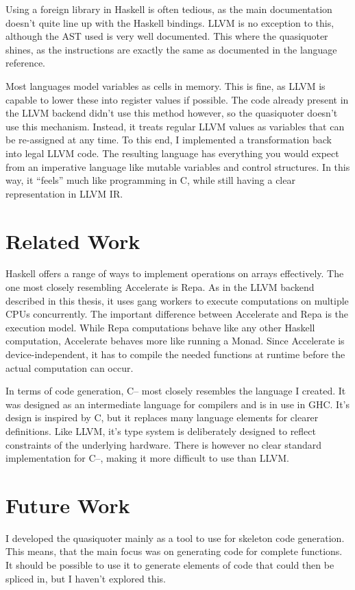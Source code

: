 \documentclass[a4paper,bibliography=totocnumbered,parskip,headsepline]{scrbook}
\begin{document}
Using a foreign library in Haskell is often tedious, as the main documentation doesn't quite line up with the Haskell bindings.
LLVM is no exception to this, although the AST used is very well documented.
This where the quasiquoter shines, as the instructions are exactly the same as documented in the language reference.

Most languages model variables as cells in memory.
This is fine, as LLVM is capable to lower these into register values if possible.
The code already present in the LLVM backend didn't use this method however, so the quasiquoter doesn't use this mechanism.
Instead, it treats regular LLVM values as variables that can be re-assigned at any time.
To this end, I implemented a transformation back into legal LLVM code.
The resulting language has everything you would expect from an imperative language like mutable variables and control structures.
In this way, it ``feels'' much like programming in C, while still having a clear representation in LLVM IR.

\section{Related Work}
Haskell offers a range of ways to implement operations on arrays effectively.
The one most closely resembling Accelerate is Repa.
As in the LLVM backend described in this thesis, it uses gang workers to execute computations on multiple CPUs concurrently.
The important difference between Accelerate and Repa is the execution model.
While Repa computations behave like any other Haskell computation, Accelerate behaves more like running a Monad.
Since Accelerate is device-independent, it has to compile the needed functions at runtime before the actual computation can occur.

In terms of code generation, C-- most closely resembles the language I created.
It was designed as an intermediate language for compilers and is in use in GHC.
It's design is inspired by C, but it replaces many language elements for clearer definitions.
Like LLVM, it's type system is deliberately designed to reflect constraints of the underlying hardware.
There is however no clear standard implementation for C--, making it more difficult to use than LLVM.

\section{Future Work}
I developed the quasiquoter mainly as a tool to use for skeleton code generation.
This means, that the main focus was on generating code for complete functions.
It should be possible to use it to generate elements of code that could then be spliced in, but I haven't explored this.
\end{document}
